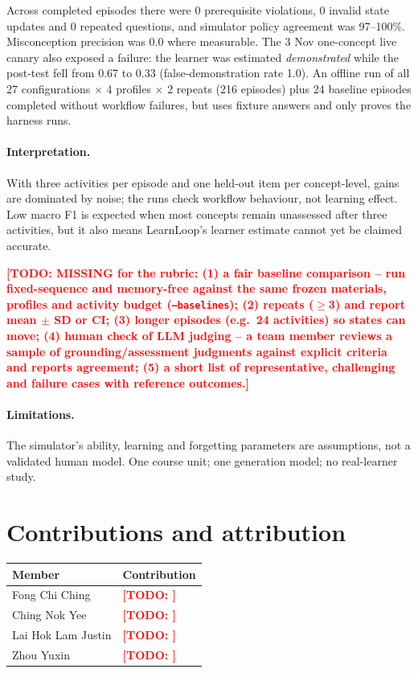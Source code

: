 \documentclass{article}
\newcommand{\todo}[1]{\textcolor{red}{\textbf{[TODO: #1]}}}
\newcommand{\code}[1]{\texttt{\small #1}}
\begin{document}
Across completed episodes there were 0 prerequisite violations, 0 invalid state updates and 0 repeated questions, and simulator policy agreement was 97--100\%. Misconception precision was 0.0 where measurable. The 3 Nov one-concept live canary also exposed a failure: the learner was estimated \emph{demonstrated} while the post-test fell from 0.67 to 0.33 (false-demonstration rate 1.0). An offline run of all 27 configurations $\times$ 4 profiles $\times$ 2 repeats (216 episodes) plus 24 baseline episodes completed without workflow failures, but uses fixture answers and only proves the harness runs.

\paragraph{Interpretation.} With three activities per episode and one held-out item per concept-level, gains are dominated by noise; the runs check workflow behaviour, not learning effect. Low macro F1 is expected when most concepts remain unassessed after three activities, but it also means LearnLoop's learner estimate cannot yet be claimed accurate.

\todo{MISSING for the rubric: (1) a \textbf{fair baseline comparison} -- run fixed-sequence and memory-free against the same frozen materials, profiles and activity budget (\code{--baselines}); (2) \textbf{repeats} ($\geq$3) and report mean $\pm$ SD or CI; (3) longer episodes (e.g.\ 24 activities) so states can move; (4) \textbf{human check of LLM judging} -- a team member reviews a sample of grounding/assessment judgments against explicit criteria and reports agreement; (5) a short list of representative, challenging and failure cases with reference outcomes.}

\paragraph{Limitations.} The simulator's ability, learning and forgetting parameters are assumptions, not a validated human model. One course unit; one generation model; no real-learner study.

\section{Contributions and attribution}

\begin{table}[H]
\centering
\small
\begin{tabularx}{\linewidth}{@{}p{3cm}X@{}}
\toprule
\textbf{Member} & \textbf{Contribution} \\
\midrule
Fong Chi Ching & \todo{} \\
Ching Nok Yee & \todo{} \\
Lai Hok Lam Justin & \todo{} \\
Zhou Yuxin & \todo{} \\
\bottomrule
\end{tabularx}
\end{table}
\end{document}
